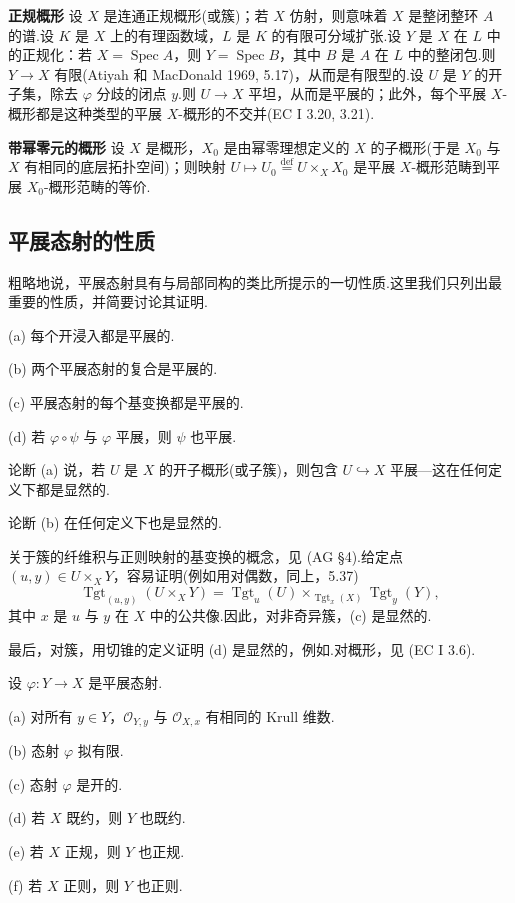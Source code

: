 \textbf{正规概形} 设 $X$ 是连通正规概形(或簇)；若 $X$ 仿射，则意味着 $X$ 是整闭整环 $A$ 的谱.设 $K$ 是 $X$ 上的有理函数域，$L$ 是 $K$ 的有限可分域扩张.设 $Y$ 是 $X$ 在 $L$ 中的正规化：若 $X = \operatorname{Spec} A$，则 $Y = \operatorname{Spec} B$，其中 $B$ 是 $A$ 在 $L$ 中的整闭包.则 $Y \to X$ 有限(Atiyah 和 MacDonald 1969, 5.17)，从而是有限型的.设 $U$ 是 $Y$ 的开子集，除去 $\varphi$ 分歧的闭点 $y$.则 $U \to X$ 平坦，从而是平展的；此外，每个平展 $X$-概形都是这种类型的平展 $X$-概形的不交并(EC I 3.20, 3.21).

\textbf{带幂零元的概形} 设 $X$ 是概形，$X_0$ 是由幂零理想定义的 $X$ 的子概形(于是 $X_0$ 与 $X$ 有相同的底层拓扑空间)；则映射 $U \mapsto U_0 \overset{\mathrm{def}}{=} U \times_{X} X_0$ 是平展 $X$-概形范畴到平展 $X_0$-概形范畴的等价.

\subsection*{平展态射的性质}

粗略地说，平展态射具有与局部同构的类比所提示的一切性质.这里我们只列出最重要的性质，并简要讨论其证明.

\begin{proposition}\label{prop:2.11}
(a) 每个开浸入都是平展的.

(b) 两个平展态射的复合是平展的.

(c) 平展态射的每个基变换都是平展的.

(d) 若 $\varphi \circ \psi$ 与 $\varphi$ 平展，则 $\psi$ 也平展.
\end{proposition}

论断 (a) 说，若 $U$ 是 $X$ 的开子概形(或子簇)，则包含 $U \hookrightarrow X$ 平展---这在任何定义下都是显然的.

论断 (b) 在任何定义下也是显然的.

关于簇的纤维积与正则映射的基变换的概念，见 (AG \S 4).给定点 $(u, y) \in U \times_{X} Y$，容易证明(例如用对偶数，同上，5.37)
\[
\operatorname{Tgt}_{(u,y)}(U \times_{X} Y) = \operatorname{Tgt}_{u}(U) \times_{\operatorname{Tgt}_{x}(X)} \operatorname{Tgt}_{y}(Y),
\]
其中 $x$ 是 $u$ 与 $y$ 在 $X$ 中的公共像.因此，对非奇异簇，(c) 是显然的.

最后，对簇，用切锥的定义证明 (d) 是显然的，例如.对概形，见 (EC I 3.6).

\begin{proposition}\label{prop:2.12}
设 $\varphi \colon Y \to X$ 是平展态射.

(a) 对所有 $y \in Y$，$\mathcal{O}_{Y, y}$ 与 $\mathcal{O}_{X, x}$ 有相同的 Krull 维数.

(b) 态射 $\varphi$ 拟有限.

(c) 态射 $\varphi$ 是开的.

(d) 若 $X$ 既约，则 $Y$ 也既约.

(e) 若 $X$ 正规，则 $Y$ 也正规.

(f) 若 $X$ 正则，则 $Y$ 也正则.
\end{proposition}

